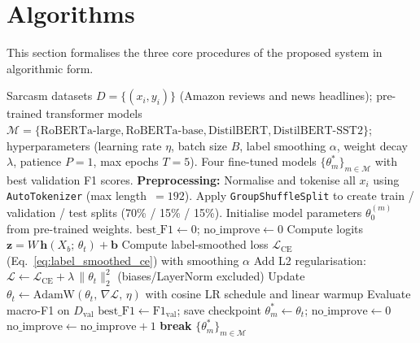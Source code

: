 
\section{Algorithms}\label{sec:algorithms}

This section formalises the three core procedures of the proposed system in algorithmic form.

\begin{algorithm}[H]
\caption{Training the Sarcasm Detector}\label{alg:training}
\begin{algorithmic}[1]
\Require Sarcasm datasets $D = \{(x_i, y_i)\}$ (Amazon reviews and news headlines); pre-trained transformer models $\mathcal{M} = \{\text{RoBERTa-large}, \text{RoBERTa-base}, \text{DistilBERT}, \text{DistilBERT-SST2}\}$; hyperparameters (learning rate $\eta$, batch size $B$, label smoothing $\alpha$, weight decay $\lambda$, patience $P=1$, max epochs $T=5$).
\Ensure Four fine-tuned models $\{\theta^{*}_m\}_{m \in \mathcal{M}}$ with best validation F1 scores.
\Statex
\State \textbf{Preprocessing:} Normalise and tokenise all $x_i$ using \texttt{AutoTokenizer} (max length~$= 192$).
\State Apply \texttt{GroupShuffleSplit} to create train / validation / test splits (70\% / 15\% / 15\%).
\Statex
{}
    \State Initialise model parameters $\theta_0^{(m)}$ from pre-trained weights.
    \State $\text{best\_F1} \gets 0$; $\text{no\_improve} \gets 0$
            \State Compute logits $\mathbf{z} = W\, \mathbf{h}(X_b;\, \theta_t) + \mathbf{b}$
            \State Compute label-smoothed loss $\mathcal{L}_{\text{CE}}$ (Eq.~\ref{eq:label_smoothed_ce}) with smoothing $\alpha$
            \State Add L2 regularisation: $\mathcal{L} \gets \mathcal{L}_{\text{CE}} + \lambda\, \|\theta_t\|_2^2$ (biases/LayerNorm excluded)
            \State Update $\theta_{t} \gets \text{AdamW}(\theta_{t},\, \nabla \mathcal{L},\, \eta)$ with cosine LR schedule and linear warmup
        \EndFor
        \State Evaluate macro-F1 on $D_{\text{val}}$
            \State $\text{best\_F1} \gets \text{F1}_{\text{val}}$; save checkpoint $\theta^{*}_m \gets \theta_t$; $\text{no\_improve} \gets 0$
        \Else
            \State $\text{no\_improve} \gets \text{no\_improve} + 1$
        \EndIf
            \State \textbf{break} 
        \EndIf
    \EndFor
\EndFor
\State \Return $\{\theta^{*}_m\}_{m \in \mathcal{M}}$
\end{algorithmic}
\end{algorithm}

